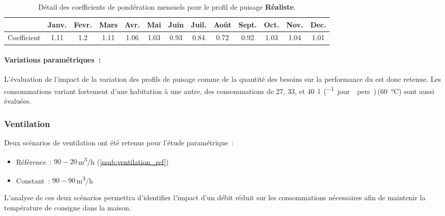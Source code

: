\begin{table}
\centering
\caption[Détail des coefficients de pondération mensuels pour le profil de puisage Réaliste]
        {Détail des coefficients de pondération mensuels pour le profil de
         puisage \textbf{Réaliste}.}
\label{tab:coef_mois}
\begin{tabular}{l*{12}{c}}
    \toprule
                & Janv. & Fevr. & Mars & Avr. & Mai & Juin & Juil. & Août & Sept. & Oct. & Nov. & Dec. \\
    \midrule
    Coefficient & \num{1.11}   & \num{1.2}   & \num{1.11}  & \num{1.06}  & \num{1.03}  & \num{0.93}   & \num{0.84}    & \num{0.72}   & \num{0.92}    & \num{1.03}  & \num{1.04}  & \num{1.01}  \\
    \bottomrule
\end{tabular}
\end{table}

\paragraph{Variations paramétriques~:} %
\label{par:variations_parametriques}
L’évaluation de l’impact de la variation des profils de puisage comme de la quantité des
besoins sur la performance du  est donc retenue. Les consommations variant fortement
d’une habitation à une autre, des consommations de \num{27}, \num{33}, et
\SI{40}{\litre\per(jour \period  pers)}\,(\SI{60}{\celsius}) sont aussi évaluées.


\subsubsection{Ventilation} %
\label{ssub:ventilation}
Deux scénarios de ventilation ont été retenus pour l’étude paramétrique~:
\begin{itemize}
    \item Référence~: $90-20$\,\si[per-mode=symbol]{\meter\cubed\per\hour} (\ref{ssub:ventilation_ref})
    \item Constant~: $90-90$\,\si[per-mode=symbol]{\meter\cubed\per\hour}
\end{itemize}
L’analyse de ces deux scénarios permettra d’identifier l’impact d’un débit réduit sur
les consommations nécessaires afin de maintenir la température de consigne dans la
maison.
\bigskip



